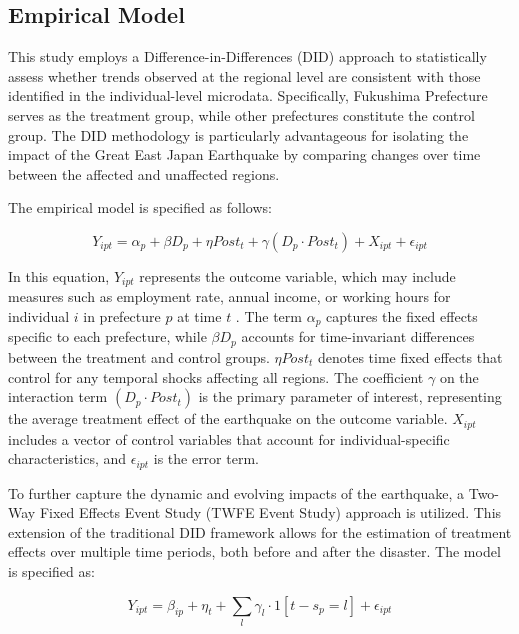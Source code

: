 \documentclass[a4paper,12pt]{article}
\begin{document}
\subsection{Empirical Model}

This study employs a Difference-in-Differences (DID) approach to statistically assess whether trends observed at the regional level are consistent with those identified in the individual-level microdata. Specifically, Fukushima Prefecture serves as the treatment group, while other prefectures constitute the control group. The DID methodology is particularly advantageous for isolating the impact of the Great East Japan Earthquake by comparing changes over time between the affected and unaffected regions.

The empirical model is specified as follows:

\begin{equation}
Y_{ipt} = \alpha_{p} + \beta D_{p} + \eta Post_{t} + \gamma (D_{p} \cdot Post_{t}) + X_{ipt} + \epsilon_{ipt}
\end{equation}

In this equation, $Y_{ipt}$ represents the outcome variable, which may include measures such as employment rate, annual income, or working hours for individual  $i$ in prefecture $p$  at time $t$ . The term $\alpha_{p}$ captures the fixed effects specific to each prefecture, while $\beta D_{p}$ accounts for time-invariant differences between the treatment and control groups. $\eta Post_{t}$ denotes time fixed effects that control for any temporal shocks affecting all regions. The coefficient $\gamma$ on the interaction term $(D_{p} \cdot Post_{t})$ is the primary parameter of interest, representing the average treatment effect of the earthquake on the outcome variable. $X_{ipt}$ includes a vector of control variables that account for individual-specific characteristics, and $\epsilon_{ipt} $ is the error term.

To further capture the dynamic and evolving impacts of the earthquake, a Two-Way Fixed Effects Event Study (TWFE Event Study) approach is utilized. This extension of the traditional DID framework allows for the estimation of treatment effects over multiple time periods, both before and after the disaster. The model is specified as:

\begin{equation}
Y_{ipt} = \beta_{ip} + \eta_{t} + \sum_{l} \gamma_{l} \cdot 1[t - s_{p} = l] + \epsilon_{ipt}
\end{equation}
\end{document}
